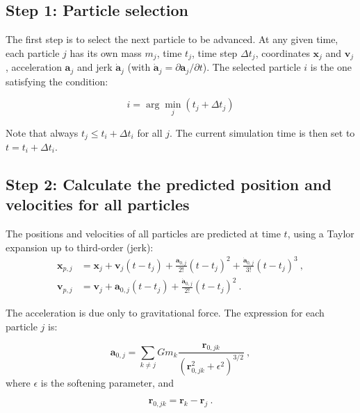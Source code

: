 \begin{appendixs}
	\subsection{Step 1: Particle selection}
	\label{ap:A.1}
	The first step is to select the next particle to be advanced. At any given time, each particle $j$ has its own mass $m_j$, time $t_j$, time step $\Delta t_j$, coordinates $\mathbf{x}_j$ and $\mathbf{v}_j$, acceleration $\mathbf{a}_j$ and jerk $\dot{\mathbf{a}}_j$ (with $\dot{\mathbf{a}}_j = \partial \mathbf{a}_j / \partial t$). The selected particle $i$ is the one satisfying the condition:
	
	\begin{equation}
		i = \arg\min_j(t_j + \Delta t_j)
	\end{equation}
	
	Note that always $t_j \leq t_i + \Delta t_i$ for all $j$. The current simulation time is then set to $t = t_i + \Delta t_i$.
	
	\subsection{Step 2: Calculate the predicted position and velocities for all particles}
	\label{ap:A.2}
	
	The positions and velocities of all particles are predicted at time $t$, using a Taylor expansion up to third-order (jerk):
	\begin{align}
		\mathbf{x}_{p, j} &= \mathbf{x}_j + \mathbf{v}_j (t - t_j) + \frac{\mathbf{a}_{0,j}}{2!} (t - t_j)^2 + \frac{\dot{\mathbf{a}}_{0,j}}{3!} (t - t_j)^3 \label{eq:ap_xpred} ~,\\
		\mathbf{v}_{p, j} &= \mathbf{v}_j + \mathbf{a}_{0,j} (t - t_j) + \frac{\dot{\mathbf{a}}_{0,j}}{2!} (t - t_j)^2 ~.\label{eq:ap_velpred}
	\end{align}
	
	The acceleration is due only to gravitational force. The expression for each particle $j$ is:
	
	\begin{equation}
		\mathbf{a}_{0, j} = \sum_{k \neq j} G m_k \frac{\mathbf{r}_{0,jk}}{(\mathbf{r}_{0,jk}^2 + \epsilon^2)^{3/2}} ~,\label{eq:ap_accel}
	\end{equation}
	where $\epsilon$ is the softening parameter, and
	
	\begin{equation}
		\mathbf{r}_{0,jk} = \mathbf{r}_{k} - \mathbf{r}_{j}~.
	\end{equation}
	

\end{appendixs}

